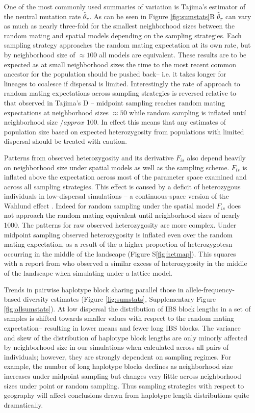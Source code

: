 \documentclass[10pt,twoside,lineno]{gsajnl}
\begin{document}
One of the most commonly used summaries of variation is Tajima's estimator of the neutral mutation rate $\widehat{\theta}_{\pi}$. As can be seen in Figure \ref{fig:sumstats}B $\widehat{\theta}_{\pi}$ can vary as much as nearly three-fold for the smallest neighborhood sizes between the random mating and spatial models depending on the sampling strategies. Each sampling strategy approaches the random mating expectation at its own rate, but by neighborhood size of $\approx 100$ all models are equivalent. These results are to be expected as at small neighborhood sizes the time to the most recent common ancestor for the population should be pushed back-- i.e. it takes longer for lineages to coalesce if dispersal is limited. Interestingly the rate of approach to random mating expectations across sampling strategies is reversed relative to that observed in Tajima's D -- midpoint sampling reaches random mating expectations at neighborhood sizes $\approx50$ while random sampling is inflated until neighborhood size $/approx$ 100. In effect this means that any estimates of population size based on expected heterozygosity from populations with limited dispersal should be treated with caution. 

Patterns from observed heterozygosity and its derivative $F_{is}$ also depend heavily on neighborhood size under spatial models as well as the sampling scheme. $F_{is}$ is inflated above the expectation across most of the parameter space examined and across all sampling strategies. This effect is caused by a deficit of heterozygous individuals in low-dispersal simulations -- a continuous-space version of the Wahlund effect \citep{Wahlund1928}. Indeed for random sampling under the spatial model $F_{is}$ does not approach the random mating equivalent until neighborhood sizes of nearly 1000. The patterns for raw observed heterozygosity are more complex. Under midpoint sampling observed heterozygosity is inflated even over the random mating expectation, as a result of the a higher proportion of heterozygotesn occurring in the middle of the landscape (Figure S\ref{fig:hetmap}). This squares with a report from \cite{Shirk2014} who observed a similar excess of heterozygosity in the middle of the landscape when simulating under a lattice model.

Trends in pairwise haplotype block sharing parallel those in allele-frequency-based diversity estimates (Figure \ref{fig:sumstats}, Supplementary Figure \ref{fig:allsumstats}). At low dispersal the distribution of IBS block lengths in a set of samples is shifted towards smaller values with respect to the random mating expectation-- resulting in lower means and fewer long IBS blocks. The variance and skew of the distribution of haplotype block lengths are only minorly affected by neighborhood size in our simulations when calculated across all pairs of individuals; however, they are strongly dependent on sampling regimes. For example, the number of long haplotype blocks declines as neighborhood size increases under midpoint sampling but changes very little across neighborhood sizes under point or random sampling. Thus sampling strategies with respect to geography will affect conclusions drawn from haplotype length distributions quite dramatically. 
\end{document}
